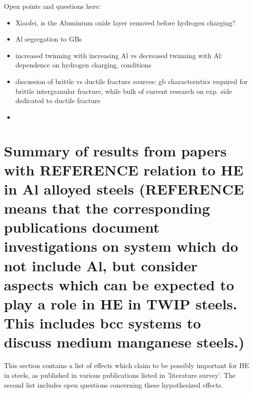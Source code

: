 \documentclass[11pt,floatfix,showpacs]{amsart}
\newcommand{\se}{\section}
\begin{document}
Open points and questions here:\\
\begin{itemize}
\item Xiaofei, is the Aluminium oxide layer removed before hydrogen charging?
\item Al segregation to GBs
\item increased twinning with increasing Al vs decreased twinning with Al: dependence on hydrogen charging, conditions 
\item discussion of brittle vs ductile fracture sources: gb characteristics required for brittle intergranular fracture, while bulk of current research on exp. side dedicated to ductile fracture
\item 
\end{itemize}

\se{Summary of results from papers with REFERENCE relation to HE in Al alloyed steels (REFERENCE means that the corresponding publications document investigations on system which do not include Al, but consider aspects which can be expected to play a role in HE in TWIP steels. This includes bcc systems to discuss medium manganese steels.)}

This section contains a list of effects which claim to be possibly important for HE in steels, as published in various publications listed in 'literature survey'. The second list includes open questions concerning these hypothesized effects.
\end{document}
